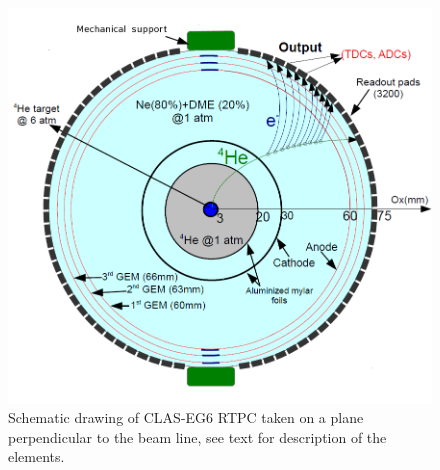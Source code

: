 \documentclass[twocolumn,showpacs,superscriptaddress,groupedaddress]{revtex4}
\begin{document}
\begin{figure}[tb]
\centering
\includegraphics[scale=0.28]{fig/RTPC_1_all.png}
\caption{Schematic drawing of CLAS-EG6 RTPC taken on a plane perpendicular to 
the beam line, see text for description of the elements.} 
\label{fig:RTPC_1_4}
\end{figure} 
\end{document}
